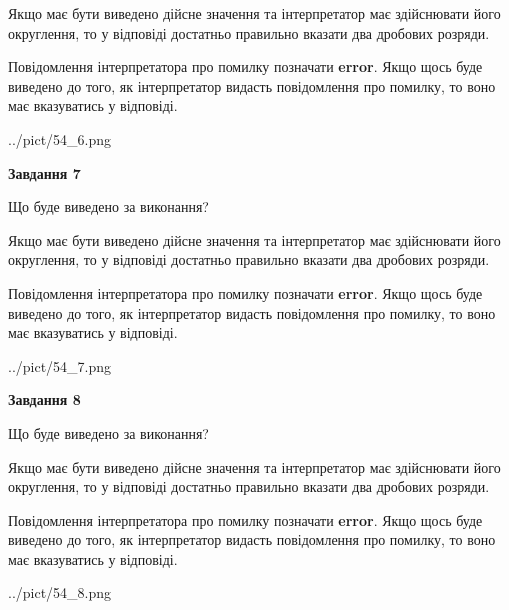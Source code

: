 \documentclass[12pt, ukrainian]{article}
\begin{document}
{\begin {Large}
Якщо має бути виведено дійсне значення та інтерпретатор має здійснювати його округлення, 
то у відповіді достатньо правильно вказати два дробових розряди.

Повідомлення інтерпретатора про помилку позначати \textbf{error}.
Якщо щось буде виведено до того, як інтерпретатор видасть повідомлення про помилку, 
то воно має вказуватись у відповіді. \par

\begin{center}
	{../pict/54_6.png}
\end{center}
\newpage

{\begin {center}\textbf{Завдання 7}\end {center}}\par
Що буде виведено за виконання? \par

Якщо має бути виведено дійсне значення та інтерпретатор має здійснювати його округлення, 
то у відповіді достатньо правильно вказати два дробових розряди.

Повідомлення інтерпретатора про помилку позначати \textbf{error}.
Якщо щось буде виведено до того, як інтерпретатор видасть повідомлення про помилку, 
то воно має вказуватись у відповіді. \par

\begin{center}
	{../pict/54_7.png}
\end{center}
\newpage

{\begin {center}\textbf{Завдання 8}\end {center}}\par
Що буде виведено за виконання? \par

Якщо має бути виведено дійсне значення та інтерпретатор має здійснювати його округлення, 
то у відповіді достатньо правильно вказати два дробових розряди.

Повідомлення інтерпретатора про помилку позначати \textbf{error}.
Якщо щось буде виведено до того, як інтерпретатор видасть повідомлення про помилку, 
то воно має вказуватись у відповіді. \par

\begin{center}
	{../pict/54_8.png}
\end{center}
\newpage


\end{Large}}
\end{document}
